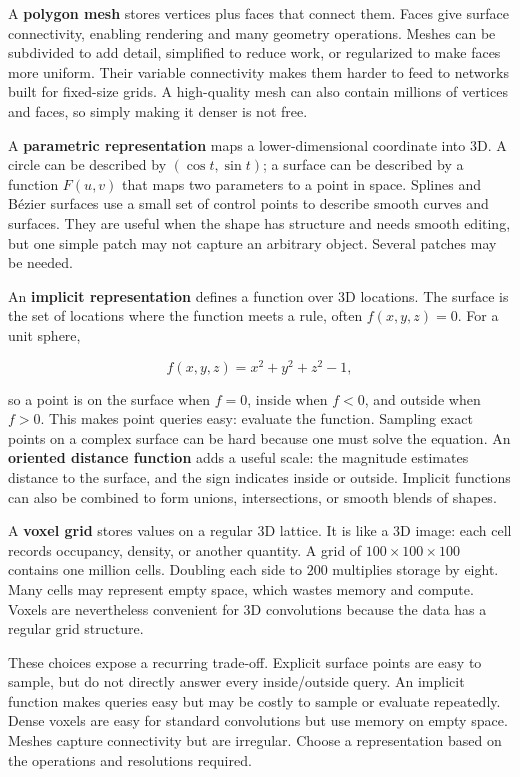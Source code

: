 A \textbf{polygon mesh} stores vertices plus faces that connect them. Faces give surface connectivity, enabling rendering and many geometry operations. Meshes can be subdivided to add detail, simplified to reduce work, or regularized to make faces more uniform. Their variable connectivity makes them harder to feed to networks built for fixed-size grids. A high-quality mesh can also contain millions of vertices and faces, so simply making it denser is not free.

A \textbf{parametric representation} maps a lower-dimensional coordinate into 3D. A circle can be described by \((\cos t,\sin t)\); a surface can be described by a function \(F(u,v)\) that maps two parameters to a point in space. Splines and Bézier surfaces use a small set of control points to describe smooth curves and surfaces. They are useful when the shape has structure and needs smooth editing, but one simple patch may not capture an arbitrary object. Several patches may be needed.

An \textbf{implicit representation} defines a function over 3D locations. The surface is the set of locations where the function meets a rule, often \(f(x,y,z)=0\). For a unit sphere,

\[
f(x,y,z)=x^2+y^2+z^2-1,
\]

so a point is on the surface when \(f=0\), inside when \(f<0\), and outside when \(f>0\). This makes point queries easy: evaluate the function. Sampling exact points on a complex surface can be hard because one must solve the equation. An \textbf{oriented distance function} adds a useful scale: the magnitude estimates distance to the surface, and the sign indicates inside or outside. Implicit functions can also be combined to form unions, intersections, or smooth blends of shapes.

A \textbf{voxel grid} stores values on a regular 3D lattice. It is like a 3D image: each cell records occupancy, density, or another quantity. A grid of \(100\times100\times100\) contains one million cells. Doubling each side to \(200\) multiplies storage by eight. Many cells may represent empty space, which wastes memory and compute. Voxels are nevertheless convenient for 3D convolutions because the data has a regular grid structure.

These choices expose a recurring trade-off. Explicit surface points are easy to sample, but do not directly answer every inside/outside query. An implicit function makes queries easy but may be costly to sample or evaluate repeatedly. Dense voxels are easy for standard convolutions but use memory on empty space. Meshes capture connectivity but are irregular. Choose a representation based on the operations and resolutions required.

